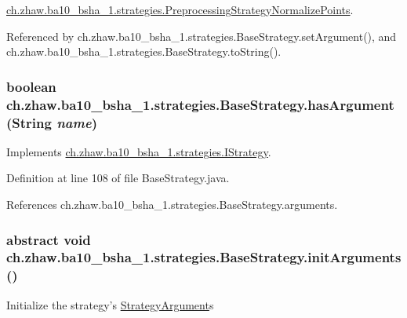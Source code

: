 \hyperlink{classch_1_1zhaw_1_1ba10__bsha__1_1_1strategies_1_1PreprocessingStrategyNormalizePoints_ac9826f8ef875b62955887e6f3ffe7cff}{ch.zhaw.ba10\_\-bsha\_\-1.strategies.PreprocessingStrategyNormalizePoints}.

Referenced by ch.zhaw.ba10\_\-bsha\_\-1.strategies.BaseStrategy.setArgument(), and ch.zhaw.ba10\_\-bsha\_\-1.strategies.BaseStrategy.toString().\hypertarget{classch_1_1zhaw_1_1ba10__bsha__1_1_1strategies_1_1BaseStrategy_a468d38d65e49d18ced35a34962e3f667}{
\subsubsection[{hasArgument}]{\setlength{\rightskip}{0pt plus 5cm}boolean ch.zhaw.ba10\_\-bsha\_\-1.strategies.BaseStrategy.hasArgument (String {\em name})}}
\label{classch_1_1zhaw_1_1ba10__bsha__1_1_1strategies_1_1BaseStrategy_a468d38d65e49d18ced35a34962e3f667}


Implements \hyperlink{interfacech_1_1zhaw_1_1ba10__bsha__1_1_1strategies_1_1IStrategy_a32756f860175f58c3d01b453cdc46bc2}{ch.zhaw.ba10\_\-bsha\_\-1.strategies.IStrategy}.

Definition at line 108 of file BaseStrategy.java.

References ch.zhaw.ba10\_\-bsha\_\-1.strategies.BaseStrategy.arguments.\hypertarget{classch_1_1zhaw_1_1ba10__bsha__1_1_1strategies_1_1BaseStrategy_a0496e8fd0099a5f0f7765322d7e752a9}{
\subsubsection[{initArguments}]{\setlength{\rightskip}{0pt plus 5cm}abstract void ch.zhaw.ba10\_\-bsha\_\-1.strategies.BaseStrategy.initArguments ()}}
\label{classch_1_1zhaw_1_1ba10__bsha__1_1_1strategies_1_1BaseStrategy_a0496e8fd0099a5f0f7765322d7e752a9}
Initialize the strategy's \hyperlink{classch_1_1zhaw_1_1ba10__bsha__1_1_1StrategyArgument}{StrategyArgument}s 

